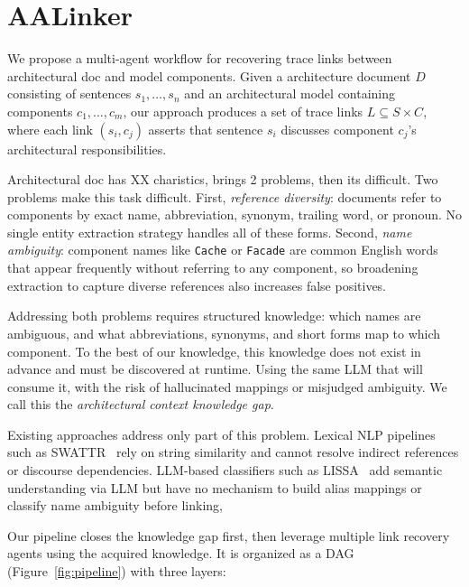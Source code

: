 \section{AALinker}

We propose a multi-agent workflow for recovering  trace links between architectural doc and model components.
Given a architecture document $D$ consisting of sentences ${s_1, \ldots, s_n}$ and an architectural model containing components ${c_1, \ldots, c_m}$, our approach produces a set of trace links $L \subseteq S
  \times C$, where each link $(s_i, c_j)$ asserts that sentence $s_i$ discusses component $c_j$'s architectural responsibilities.

Architectural doc has XX charistics, brings 2 problems, then its difficult.
Two problems make this task difficult.
First, \emph{reference diversity}: documents refer to components by exact name, abbreviation, synonym, trailing word, or pronoun.
No single entity extraction strategy handles all of these forms.
Second, \emph{name ambiguity}: component names like \texttt{Cache} or \texttt{Facade} are common English words that appear frequently without referring to any component, 
so broadening extraction to capture diverse references also increases false positives.

Addressing both problems requires structured knowledge: which names are ambiguous, and what abbreviations, synonyms, and short forms map to which component.
To the best of our knowledge, this knowledge does not exist in advance and must be discovered at runtime. 
Using the same LLM that will consume it, with the risk of hallucinated mappings or misjudged ambiguity. 
We call this the \emph{architectural context knowledge gap}.

Existing approaches address only part of this problem.
Lexical NLP pipelines such as SWATTR~\cite{swattr} rely on string similarity and cannot resolve indirect references or discourse dependencies.
LLM-based classifiers such as LISSA~\cite{lissa} add semantic understanding via LLM 
but have no mechanism to build alias mappings or classify name ambiguity before linking,

Our pipeline closes the knowledge gap first, then leverage multiple link recovery agents using the acquired knowledge.
It is organized as a DAG (Figure~\ref{fig:pipeline}) with three layers:

